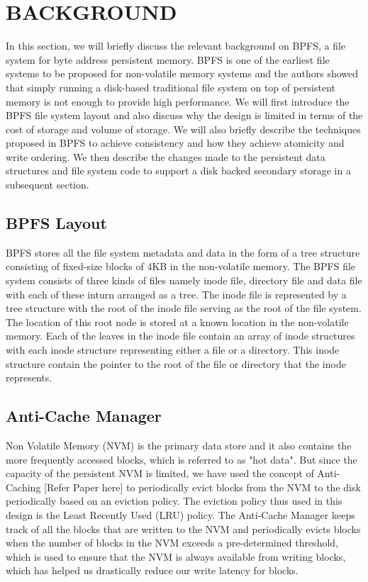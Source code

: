 \documentclass[letterpaper, 10 pt, conference]{ieeeconf}  %
\begin{document}
\section{BACKGROUND}
In this section, we will briefly discuss the relevant background on BPFS, a file system for byte address persistent memory. BPFS is one of the earliest file systems to be proposed for non-volatile memory systems and the authors showed that simply running a disk-based traditional file system on top of persistent memory is not enough to provide high performance. We will first introduce the BPFS file system layout and also discuss why the design is limited in terms of the cost of storage and volume of storage. We will also briefly describe the techniques proposed in BPFS to achieve consistency and how they achieve atomicity and write ordering. We then describe the changes made to the persistent data structures and file system code to support a disk backed secondary storage in a subsequent section.



\subsection{BPFS Layout}
BPFS stores all the file system metadata and data in the form of a tree structure consisting of fixed-size blocks of 4KB in the non-volatile memory. The BPFS file system consists of three kinds of files namely inode file, directory file and data file with each of these inturn arranged as a tree. The inode file is represented by a tree structure with the root of the inode file serving as the root of the file system. The location of this root node is stored at a known location in the non-volatile memory. Each of the leaves in the inode file contain an array of inode structures with each inode structure representing either a file or a directory. This inode structure contain the pointer to the root of the file or directory that the inode represents.

\subsection{Anti-Cache Manager}

Non Volatile Memory (NVM) is the primary data store and it also contains the more frequently accessed blocks, which is referred to as "hot data". But since the capacity of the persistent NVM is limited, we have used the concept of Anti-Caching [Refer Paper here] to periodically evict blocks from the NVM to the disk periodically based on an eviction policy. The eviction policy thus used in this design is the Least Recently Used (LRU) policy. The Anti-Cache Manager keeps track of all the blocks that are written to the NVM and periodically evicts blocks when the number of blocks in the NVM exceeds a pre-determined threshold, which is used to ensure that the NVM is always available from writing blocks, which has helped us drastically reduce our write latency for blocks. \\
\end{document}
